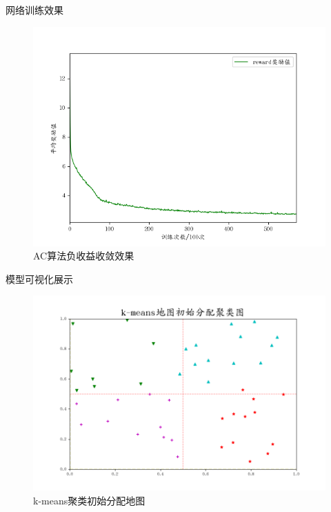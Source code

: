 \documentclass{beamer}
\begin{document}
\begin{frame}{网络训练效果}

    \begin{figure}[htbp]
        \centering
        \includegraphics[scale=0.4]{pic/reward.png}
        \caption{AC算法负收益收敛效果}
    \end{figure}
\end{frame}

\begin{frame}{模型可视化展示}
    \begin{figure}[htbp]
        \centering
        \includegraphics[scale=0.4]{pic/test1.png}
        \caption{k-means聚类初始分配地图}
    \end{figure}
\end{frame}
\end{document}
